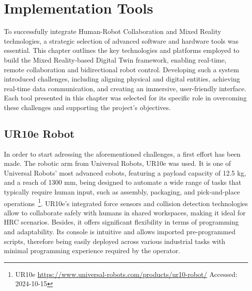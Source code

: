 

\chapter{Implementation Tools}%
\label{chapter:tools}



\begin{introduction}
    To successfully integrate Human-Robot Collaboration and Mixed Reality technologies, a strategic selection of advanced software and hardware tools was essential. This chapter outlines the key technologies and platforms employed to build the Mixed Reality-based Digital Twin framework, enabling real-time, remote collaboration and bidirectional robot control. Developing such a system introduced challenges, including aligning physical and digital entities, achieving real-time data communication, and creating an immersive, user-friendly interface. Each tool presented in this chapter was selected for its specific role in overcoming these challenges and supporting the project’s objectives.
\end{introduction}

\section{UR10e Robot}

In order to start adressing the aforementioned challenges, a first effort has been made. The robotic arm from Universal Robots, UR10e was used. It is one of Universal Robots' most advanced cobots, featuring a payload capacity of 12.5 kg, and a reach of 1300 mm, being designed to automate a wide range of tasks that typically require human input, such as assembly, packaging, and pick-and-place operations~\footnote{UR10e \url{https://www.universal-robots.com/products/ur10-robot/} Accessed: 2024-10-15}. UR10e's integrated force sensors and collision detection technologies allow to collaborate safely with humans in shared workspaces, making it ideal for \ac{HRC} scenarios. Besides, it offers significant flexibility in terms of programming and adaptability. Its console is intuitive and allows imported pre-programmed scripts, therefore being easily deployed across various industrial tasks with minimal programming experience required by the operator.

